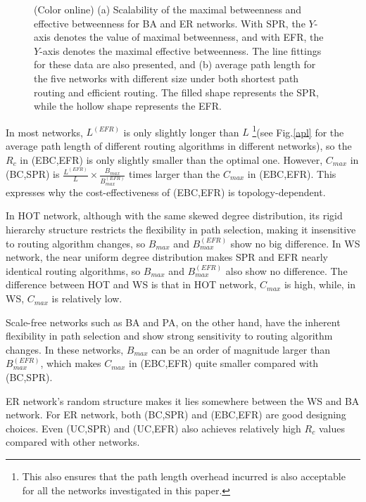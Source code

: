 \documentclass[journal]{IEEEtran}
\begin{document}
{\begin{figure*}[!t]
\centering
  
 \caption{(Color online) (a) Scalability of the maximal betweenness and
effective betweenness for BA and ER networks. With SPR, the $Y$-axis
denotes the value of maximal betweenness, and with EFR, the $Y$-axis
denotes the maximal effective betweenness. The line fittings for
these data are also presented, and (b) average path length for the
five networks with different size under both shortest path routing
and efficient routing. The filled shape represents the SPR, while
the hollow shape represents the EFR.}
\end{figure*}
In most networks, $L^{(EFR)}$ is only slightly longer than $L$
\footnote{This also ensures that the path length overhead incurred
is also acceptable for all the networks investigated in this
paper.}(see Fig.\ref{apl} for the average path length of different
routing algorithms in different networks), so the $R_c$ in (EBC,EFR)
is only slightly smaller than the optimal one.   However, $C_{max}$
in (BC,SPR) is
$\frac{L^{(EFR)}}{L}\times\frac{B_{max}}{B^{(EFR)}_{max}}$ times
larger than the $C_{max}$ in (EBC,EFR). This expresses why the
cost-effectiveness of (EBC,EFR) is topology-dependent.

In HOT network, although with the same skewed degree distribution,
its rigid hierarchy structure restricts the flexibility in path
selection, making it insensitive to routing algorithm changes, so
$B_{max}$ and $B^{(EFR)}_{max}$ show no big difference. In WS
network, the near uniform degree distribution makes SPR and EFR
nearly identical routing algorithms, so $B_{max}$ and
$B_{max}^{(EFR)}$ also show no difference. The difference between
HOT and WS is that in HOT network, $C_{max}$ is high, while, in WS,
$C_{max}$ is relatively low.

Scale-free networks such as BA and PA, on the other hand, have the
inherent flexibility in path selection and show strong sensitivity
to routing algorithm changes. In these networks, $B_{max}$ can be an
order of magnitude larger than $B^{(EFR)}_{max}$, which makes
$C_{max}$ in (EBC,EFR) quite smaller compared with (BC,SPR).

ER network's random structure makes it lies somewhere between the WS
and BA network. For ER network, both (BC,SPR) and (EBC,EFR) are good
designing choices. Even (UC,SPR) and (UC,EFR) also achieves
relatively high $R_c$ values compared with other networks.





}
\end{document}
